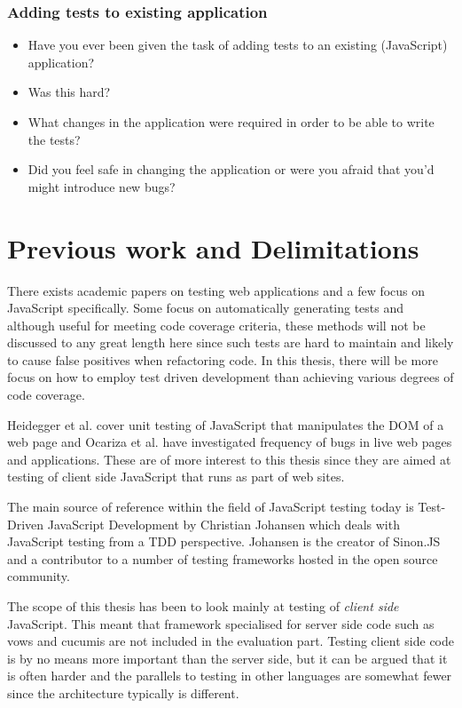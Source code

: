 \documentclass[11pt]{article}
\begin{document}
\subsubsection{Adding tests to existing application}
\begin{itemize}
\item Have you ever been given the task of adding tests to an existing (JavaScript) application?
\item Was this hard?
\item What changes in the application were required in order to be able to write the tests?
\item Did you feel safe in changing the application or were you afraid that you'd might introduce new bugs?
\end{itemize}

\section{Previous work and Delimitations}

There exists academic papers on testing web applications and a few focus on JavaScript specifically. Some focus on automatically generating tests\cite{AutomatedTesting} and although useful for meeting code coverage criteria, these methods will not be discussed to any great length here since such tests are hard to maintain and likely to cause false positives when refactoring code. In this thesis, there will be more focus on how to employ test driven development than achieving various degrees of code coverage.

Heidegger et al. cover unit testing of JavaScript that manipulates the DOM of a web page\cite{DOMJavascript} and Ocariza et al. have investigated frequency of bugs in live web pages and applications\cite{Wild}. These are of more interest to this thesis since they are aimed at testing of client side JavaScript that runs as part of web sites.

The main source of reference within the field of JavaScript testing today is Test-Driven JavaScript Development\cite{Tddjs} by Christian Johansen which deals with JavaScript testing from a TDD perspective. Johansen is the creator of Sinon.JS\cite{SinonJS} and a contributor to a number of testing frameworks hosted in the open source community.

The scope of this thesis has been to look mainly at testing of \emph{client side} JavaScript. This meant that framework specialised for server side code such as vows\cite{Vows} and cucumis\cite{Cucumis} are not included in the evaluation part. Testing client side code is by no means more important than the server side, but it can be argued that it is often harder and the parallels to testing in other languages are somewhat fewer since the architecture typically is different.
\end{document}
